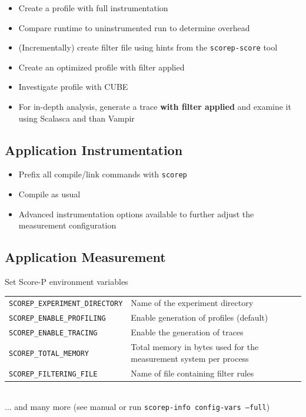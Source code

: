 \begin{itemize}
\itemsep0.1em
\item  Create a profile with full instrumentation
\item  Compare runtime to uninstrumented run to determine overhead
\item  (Incrementally) create filter file using hints from the
      \texttt{scorep-score} tool
\item  Create an optimized profile with filter applied
\item  Investigate profile with CUBE
\item  For in-depth analysis, generate a trace \textbf{with filter applied}
      and examine it using Scalasca and than Vampir
\end{itemize}


\subsection{Application Instrumentation}
\begin{itemize}
\itemsep0.1em
\item Prefix all compile/link commands with \texttt{scorep}\\
\item Compile as usual\\
\item Advanced instrumentation options available to further adjust the measurement configuration
\end{itemize}
\subsection{Application Measurement}
Set Score-P environment variables\\[1ex]
\begin{tabular}{@{}l@{ }l@{ }}
\texttt{SCOREP\_EXPERIMENT\_DIRECTORY} & Name of the experiment directory\\
\texttt{SCOREP\_ENABLE\_PROFILING} & Enable generation of profiles (default)\\
\texttt{SCOREP\_ENABLE\_TRACING} & Enable the generation of traces\\
\texttt{SCOREP\_TOTAL\_MEMORY} & Total memory in bytes used for the measurement system per process\\
\texttt{SCOREP\_FILTERING\_FILE} & Name of file containing filter rules\\
\end{tabular}\\[1ex]
... and many more (see manual or run \texttt{scorep-info config-vars ---full})\\

